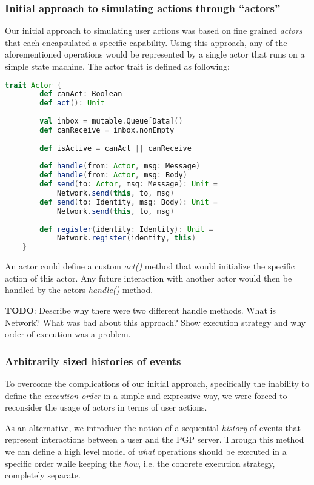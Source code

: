 \subsubsection{Initial approach to simulating actions through ``actors''}
Our initial approach to simulating user actions was based on fine grained \emph{actors} that each encapsulated a specific capability. 
Using this approach, any of the aforementioned operations would be represented by a single actor that runs on a simple state machine.
The actor trait is defined as following:
\begin{lstlisting}[language=Scala]
    trait Actor {
        def canAct: Boolean
        def act(): Unit
      
        val inbox = mutable.Queue[Data]()
        def canReceive = inbox.nonEmpty
      
        def isActive = canAct || canReceive
      
        def handle(from: Actor, msg: Message)
        def handle(from: Actor, msg: Body)
        def send(to: Actor, msg: Message): Unit = 
            Network.send(this, to, msg)
        def send(to: Identity, msg: Body): Unit = 
            Network.send(this, to, msg)
      
        def register(identity: Identity): Unit = 
            Network.register(identity, this)
    }
\end{lstlisting}
An actor could define a custom \emph{act()} method that would initialize the specific action of this actor. Any future interaction with another actor would then be handled by the actors \emph{handle()} method. 

\textbf{TODO}: Describe why there were two different handle methods. What is Network? What was bad about this approach? Show execution strategy and why order of execution was a problem.

\newpage
\subsubsection{Arbitrarily sized histories of events}
To overcome the complications of our initial approach, specifically the inability to define the \emph{execution order} in a simple and expressive way, we were forced to reconsider the usage of actors in terms of user actions.

As an alternative, we introduce the notion of a sequential \emph{history} of events that represent interactions between a user and the PGP server.
Through this method we can define a high level model of \emph{what} operations should be executed in a specific order while keeping the \emph{how}, i.e. the concrete execution strategy, completely separate.

